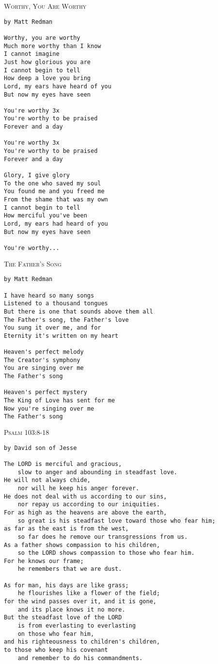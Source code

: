 \documentclass[10pt,oneside,footinclude=true,headinclude=true]{scrbook} %
\newcommand\songtitle[1]{
	\hspace*{-3.7mm}\Large\textsc{#1}
}
\begin{document}
\newpage
\bigskip
\songtitle{Worthy, You Are Worthy}
\begin{verbatim}
by Matt Redman

Worthy, you are worthy
Much more worthy than I know
I cannot imagine
Just how glorious you are
I cannot begin to tell
How deep a love you bring
Lord, my ears have heard of you
But now my eyes have seen

You're worthy 3x
You're worthy to be praised
Forever and a day

You're worthy 3x
You're worthy to be praised
Forever and a day

Glory, I give glory
To the one who saved my soul
You found me and you freed me
From the shame that was my own
I cannot begin to tell
How merciful you've been
Lord, my ears had heard of you
But now my eyes have seen
 
You're worthy...

\end{verbatim}


\newpage
\bigskip
\songtitle{The Father's Song}
\begin{verbatim}
by Matt Redman

I have heard so many songs
Listened to a thousand tongues
But there is one that sounds above them all
The Father's song, the Father's love
You sung it over me, and for
Eternity it's written on my heart

Heaven's perfect melody
The Creator's symphony
You are singing over me
The Father's song

Heaven's perfect mystery
The King of Love has sent for me
Now you're singing over me
The Father's song

\end{verbatim}

\newpage
\bigskip
\songtitle{Psalm 103:8-18}
\begin{verbatim}
by David son of Jesse

The LORD is merciful and gracious,
    slow to anger and abounding in steadfast love.
He will not always chide,
    nor will he keep his anger forever.
He does not deal with us according to our sins,
    nor repay us according to our iniquities.
For as high as the heavens are above the earth,
    so great is his steadfast love toward those who fear him;
as far as the east is from the west,
    so far does he remove our transgressions from us.
As a father shows compassion to his children,
    so the LORD shows compassion to those who fear him.
For he knows our frame;
    he remembers that we are dust.

As for man, his days are like grass;
    he flourishes like a flower of the field;
for the wind passes over it, and it is gone,
    and its place knows it no more.
But the steadfast love of the LORD
    is from everlasting to everlasting
	on those who fear him,
and his righteousness to children's children,
to those who keep his covenant
    and remember to do his commandments.

\end{verbatim}
\end{document}
